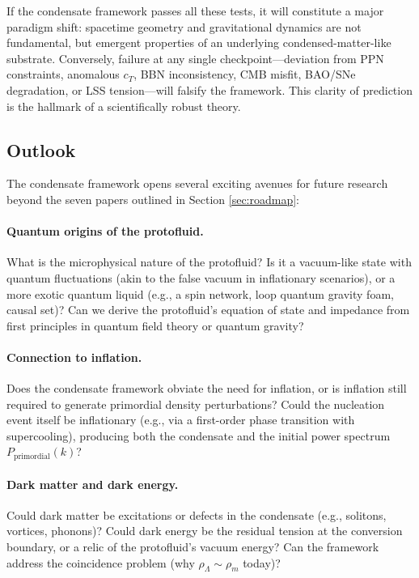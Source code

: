 \documentclass[11pt,a4paper]{article}
\theoremstyle{definition}
\begin{document}
If the condensate framework passes all these tests, it will constitute a major paradigm shift: spacetime geometry and gravitational dynamics are not fundamental, but emergent properties of an underlying condensed-matter-like substrate. Conversely, failure at any single checkpoint---deviation from PPN constraints, anomalous $c_T$, BBN inconsistency, CMB misfit, BAO/SNe degradation, or LSS tension---will falsify the framework. This clarity of prediction is the hallmark of a scientifically robust theory.

\subsection{Outlook}
\label{sec:outlook}

The condensate framework opens several exciting avenues for future research beyond the seven papers outlined in Section \ref{sec:roadmap}:

\paragraph{Quantum origins of the protofluid.}
What is the microphysical nature of the protofluid? Is it a vacuum-like state with quantum fluctuations (akin to the false vacuum in inflationary scenarios), or a more exotic quantum liquid (e.g., a spin network, loop quantum gravity foam, causal set)? Can we derive the protofluid's equation of state and impedance from first principles in quantum field theory or quantum gravity?

\paragraph{Connection to inflation.}
Does the condensate framework obviate the need for inflation, or is inflation still required to generate primordial density perturbations? Could the nucleation event itself be inflationary (e.g., via a first-order phase transition with supercooling), producing both the condensate and the initial power spectrum $P_{\mathrm{primordial}}(k)$?

\paragraph{Dark matter and dark energy.}
Could dark matter be excitations or defects in the condensate (e.g., solitons, vortices, phonons)? Could dark energy be the residual tension at the conversion boundary, or a relic of the protofluid's vacuum energy? Can the framework address the coincidence problem (why $\rho_{\Lambda} \sim \rho_m$ today)?
\end{document}
